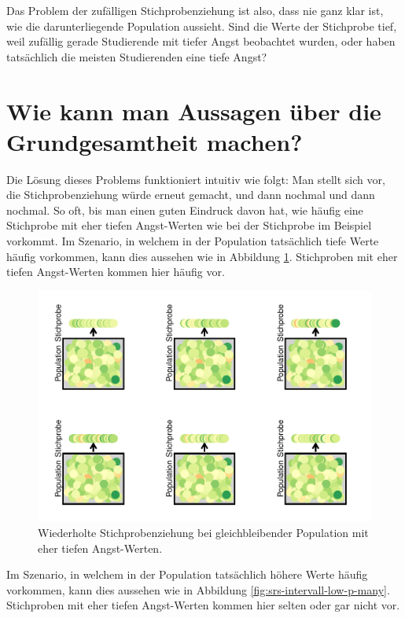 \documentclass[
]{book}
\theoremstyle{definition}
\theoremstyle{definition}
\theoremstyle{definition}
\theoremstyle{definition}
\theoremstyle{remark}
\begin{document}
Das Problem der zufälligen Stichprobenziehung ist also, dass nie ganz klar ist, wie die darunterliegende Population aussieht. Sind die Werte der Stichprobe tief, weil zufällig gerade Studierende mit tiefer Angst beobachtet wurden, oder haben tatsächlich die meisten Studierenden eine tiefe Angst?

\section{Wie kann man Aussagen über die Grundgesamtheit machen?}\label{stichprobenziehung-loesung}

Die Lösung dieses Problems funktioniert intuitiv wie folgt: Man stellt sich vor, die Stichprobenziehung würde erneut gemacht, und dann nochmal und dann nochmal. So oft, bis man einen guten Eindruck davon hat, wie häufig eine Stichprobe mit eher tiefen Angst-Werten wie bei der Stichprobe im Beispiel vorkommt. Im Szenario, in welchem in der Population tatsächlich tiefe Werte häufig vorkommen, kann dies aussehen wie in Abbildung \ref{fig:srs-intervall-high-p-many}. Stichproben mit eher tiefen Angst-Werten kommen hier häufig vor.

\begin{figure}

{\centering \includegraphics{aps_statistik1_files/figure-latex/srs-intervall-high-p-many-1} 

}

\caption{Wiederholte Stichprobenziehung bei gleichbleibender Population mit eher tiefen Angst-Werten.}\label{fig:srs-intervall-high-p-many}
\end{figure}

Im Szenario, in welchem in der Population tatsächlich höhere Werte häufig vorkommen, kann dies aussehen wie in Abbildung \ref{fig:srs-intervall-low-p-many}. Stichproben mit eher tiefen Angst-Werten kommen hier selten oder gar nicht vor.
\end{document}
